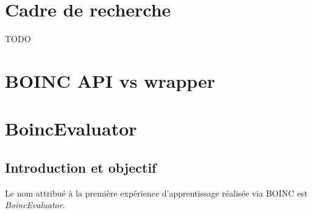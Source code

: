 \documentclass[a4paper, 11pt]{article}
\begin{document}
\section{Cadre de recherche}
TODO

\section{BOINC API vs wrapper}


\section{BoincEvaluator}
\subsection{Introduction et objectif}
Le nom attribué à la première expérience d'apprentissage réalisée via \textsc{BOINC} est \textit{BoincEvaluator}.
\end{document}
